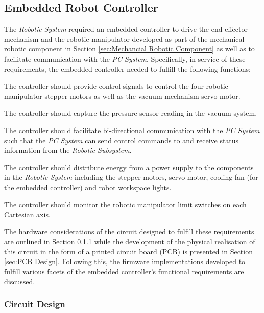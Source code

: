 \subsection{Embedded Robot Controller} \label{sec:Embedded Robot Controller}

The \textit{Robotic System} required an embedded controller to drive the end-effector mechanism and the robotic manipulator developed as part of the mechanical robotic component in Section \ref{sec:Mechancial Robotic Component} as well as to facilitate communication with the \textit{PC System}. Specifically, in service of these requirements, the embedded controller needed to fulfill the following functions:

\begin{compactitem}
	\item The controller should provide control signals to control the four robotic manipulator stepper motors as well as the vacuum mechanism servo motor.
	\item The controller should capture the pressure sensor reading in the vacuum system.
	\item The controller should facilitate bi-directional communication with the \textit{PC System} such that the \textit{PC System} can send control commands to and receive status information from the \textit{Robotic Subsystem}.
	\item The controller should distribute energy from a power supply to the components in the \textit{Robotic System} including the stepper motors, servo motor, cooling fan (for the embedded controller) and robot workspace lights.
	\item The controller should monitor the robotic manipulator limit switches on each Cartesian axis.
\end{compactitem}

The hardware considerations of the circuit designed to fulfill these requirements are outlined in Section \ref{sec:Circuit Design} while the development of the physical realisation of this circuit in the form of a printed circuit board (PCB) is presented in Section \ref{sec:PCB Design}. Following this, the firmware implementations developed to fulfill various facets of the embedded controller's functional requirements are discussed.

\subsubsection{Circuit Design} \label{sec:Circuit Design}

